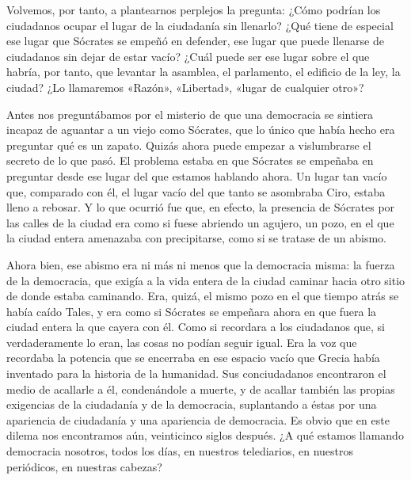 \documentclass[draft,9pt,letterpaper,twocolumn,openany]{extbook}
\newcommand{\notar}[1]{\marginnote{\small\sffamily #1}[-.8em]}
\begin{document}
Volvemos, por tanto, a plantearnos perplejos la pregunta: ¿Cómo podrían los ciudadanos ocupar el lugar de la
ciudadanía sin llenarlo? ¿Qué tiene de especial ese lugar
que Sócrates se empeñó en defender, ese lugar que
puede llenarse de ciudadanos sin dejar de estar vacío?
¿Cuál puede ser ese lugar sobre el que habría, por tanto,
que levantar la asamblea, el parlamento, el edificio de la
ley, la ciudad? ¿Lo llamaremos «Razón», «Libertad», «lugar
de cualquier otro»?


Antes nos preguntábamos por el misterio de que una
democracia se sintiera incapaz de aguantar a un viejo
como Sócrates, que lo único que había hecho era preguntar
qué es un zapato. Quizás ahora puede empezar a
vislumbrarse el secreto de lo que pasó. El problema estaba
en que Sócrates se empeñaba en preguntar desde ese lugar
del que estamos hablando ahora. Un lugar tan vacío que,
comparado con él, el lugar vacío del que tanto se asombraba
Ciro, estaba lleno a rebosar. Y lo que ocurrió fue que, en
efecto, la presencia de Sócrates por las calles de la ciudad
era como si fuese abriendo un agujero, un pozo, en el que la
ciudad entera amenazaba con precipitarse, como si se
tratase de un abismo. 

Ahora bien, ese abismo era ni más ni
menos que la democracia misma: la fuerza de la democracia,
que exigía a la vida entera de la ciudad caminar hacia otro
sitio de donde estaba caminando. Era, quizá, el mismo pozo
en el que tiempo atrás se había caído Tales, y era como si
Sócrates se empeñara ahora en que fuera la ciudad entera la
que cayera con él. Como si recordara a los ciudadanos que,
si verdaderamente lo eran, las cosas no podían seguir igual.
Era la voz que recordaba la potencia que se encerraba en ese
espacio vacío que Grecia había inventado para la historia de
la humanidad. 
Sus conciudadanos encontraron el medio de
acallarle a él, condenándole a muerte, y de acallar también
las propias exigencias de la ciudadanía y de la democracia,
suplantando a éstas por una apariencia de ciudadanía y una
apariencia de democracia. Es obvio que en este dilema nos
encontramos aún, veinticinco siglos después. ¿A qué
estamos llamando democracia nosotros, todos los días, en
nuestros telediarios, en nuestros periódicos, en nuestras
cabezas?
\end{document}
